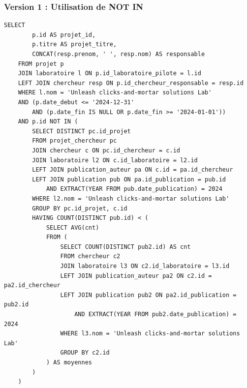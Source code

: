 \documentclass[12pt,a4paper]{article}
\begin{document}
\subsubsection{Version 1 : Utilisation de NOT IN}
\begin{lstlisting}[style=sqlstyle, caption=R2 - Version 1]
    SELECT 
        p.id AS projet_id,
        p.titre AS projet_titre,
        CONCAT(resp.prenom, ' ', resp.nom) AS responsable
    FROM projet p
    JOIN laboratoire l ON p.id_laboratoire_pilote = l.id
    LEFT JOIN chercheur resp ON p.id_chercheur_responsable = resp.id
    WHERE l.nom = 'Unleash clicks-and-mortar solutions Lab'
    AND (p.date_debut <= '2024-12-31' 
        AND (p.date_fin IS NULL OR p.date_fin >= '2024-01-01'))
    AND p.id NOT IN (
        SELECT DISTINCT pc.id_projet
        FROM projet_chercheur pc
        JOIN chercheur c ON pc.id_chercheur = c.id
        JOIN laboratoire l2 ON c.id_laboratoire = l2.id
        LEFT JOIN publication_auteur pa ON c.id = pa.id_chercheur
        LEFT JOIN publication pub ON pa.id_publication = pub.id 
            AND EXTRACT(YEAR FROM pub.date_publication) = 2024
        WHERE l2.nom = 'Unleash clicks-and-mortar solutions Lab'
        GROUP BY pc.id_projet, c.id
        HAVING COUNT(DISTINCT pub.id) < (
            SELECT AVG(cnt)
            FROM (
                SELECT COUNT(DISTINCT pub2.id) AS cnt
                FROM chercheur c2
                JOIN laboratoire l3 ON c2.id_laboratoire = l3.id
                LEFT JOIN publication_auteur pa2 ON c2.id = pa2.id_chercheur
                LEFT JOIN publication pub2 ON pa2.id_publication = pub2.id 
                    AND EXTRACT(YEAR FROM pub2.date_publication) = 2024
                WHERE l3.nom = 'Unleash clicks-and-mortar solutions Lab'
                GROUP BY c2.id
            ) AS moyennes
        )
    )
\end{lstlisting}
\end{document}
